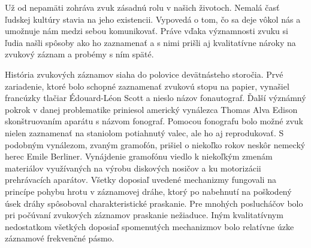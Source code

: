 
Už od nepamäti zohráva zvuk zásadnú rolu v našich životoch. Nemalá časť ľudskej kultúry stavia na jeho existencii. Vypovedá o tom, čo sa deje vôkol nás a umožnuje nám medzi sebou komunikovať. Práve vďaka významnosti zvuku si ľudia našli spôsoby ako ho zaznamenať a s nimi prišli aj kvalitatívne nároky na zvukový záznam a probémy s ním späté.

História zvukových záznamov siaha do polovice devätnásteho storočia. Prvé zariadenie, ktoré bolo schopné zaznamenať zvukovú stopu na papier, vynašiel francúzky  tlačiar Édouard-Léon Scott a nieslo názov fonautograf. Ďalší význámný pokrok v danej problematike priniesol americký vynálezca Thomas Alva Edison skonštruovaním aparátu s názvom fonograf. Pomocou fonografu bolo možné zvuk nielen zaznamenať na staniolom potiahnutý valec, ale ho aj reprodukovať. S podobným vynálezom, zvaným gramofón, prišiel o niekoľko rokov neskôr nemecký herec Emile Berliner. Vynájdenie gramofónu viedlo k niekoľkým zmenám materiálov využívaných na výrobu diskových nosičov a ku motorizácii prehrávacích aparátov. Všetky doposiaľ uvedené mechanizmy fungovali na princípe pohybu hrotu v záznamovej dráhe, ktorý po nabehnutí na poškodený úsek dráhy spôsoboval charakteristické praskanie. Pre mnohých poslucháčov bolo pri počúvaní zvukových záznamov praskanie nežiaduce. Iným kvalitatívnym nedostatkom všetkých doposiaľ spomenutých mechanizmov bolo relatívne úzke záznamové frekvenčné pásmo.

